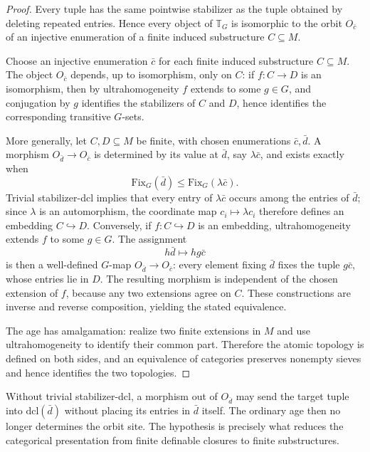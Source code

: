 \documentclass{lmcs}
\newcommand{\Fix}{\mathrm{Fix}}
\begin{document}
\begin{proof}
Every tuple has the same pointwise stabilizer as the tuple obtained by
deleting repeated entries. Hence every object of $\mathbb T_G$ is
isomorphic to the orbit $O_{\bar c}$ of an injective enumeration of a
finite induced substructure $C\subseteq M$.

Choose an injective enumeration $\bar c$ for each finite induced
substructure $C\subseteq M$. The object $O_{\bar c}$ depends, up to
isomorphism, only on $C$: if $f:C\to D$ is an isomorphism, then by
ultrahomogeneity $f$ extends to some $g\in G$, and conjugation by $g$
identifies the stabilizers of $C$ and $D$, hence identifies the
corresponding transitive $G$-sets.

More generally, let $C,D\subseteq M$ be finite, with chosen enumerations
$\bar c,\bar d$. A morphism $O_{\bar d}\to O_{\bar c}$ is determined by
its value at $\bar d$, say $\lambda\bar c$, and exists exactly when
\[
   \Fix_G(\bar d)\leq\Fix_G(\lambda\bar c).
\]
Trivial stabilizer-dcl implies that every entry of $\lambda\bar c$ occurs
among the entries of $\bar d$; since $\lambda$ is an automorphism, the
coordinate map $c_i\mapsto\lambda c_i$ therefore defines an embedding
$C\hookrightarrow D$. Conversely, if $f:C\hookrightarrow D$ is an
embedding, ultrahomogeneity extends $f$ to some $g\in G$. The assignment
\[
       h\bar d\longmapsto hg\bar c
\]
is then a well-defined $G$-map $O_{\bar d}\to O_{\bar c}$: every element
fixing $\bar d$ fixes the tuple $g\bar c$, whose entries lie in $D$.
The resulting morphism is independent of the chosen extension of $f$,
because any two extensions agree on $C$. These constructions are inverse
and reverse composition, yielding the stated equivalence.

The age has amalgamation: realize two finite extensions in $M$ and use
ultrahomogeneity to identify their common part. Therefore the atomic
topology is defined on both sides, and an equivalence of categories
preserves nonempty sieves and hence identifies the two topologies.
\end{proof}

\begin{rem}
Without trivial stabilizer-dcl, a morphism out of $O_{\bar d}$ may send
the target tuple into $\mathrm{dcl}(\bar d)$ without placing its
entries in $\bar d$ itself. The ordinary age then no longer determines
the orbit site. The hypothesis is precisely what reduces the
categorical presentation from finite definable closures to finite
substructures.
\end{rem}
\end{document}

